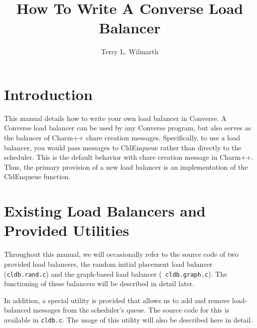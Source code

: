 \pagestyle{headings}
\setlength{\textwidth}{6.5in}
\setlength{\textheight}{9in}
\setlength{\parindent}{0in}
\setlength{\topmargin}{-.5in}
\parskip 0.1in


%
%
\newcommand{\version}{4.5}		%
\newcommand{\prevversion}{4.3}	%

%
%
\newcommand{\zap}[1]{ }
\newcommand{\fcmd}{\bf}		%
\newcommand{\fparm}{\it\sf}	%
\newcommand{\fexec}{\bf}	%
\newcommand{\atitle}[1]{{\it #1}}
\newcommand{\keyword}[1]{{\textbf{#1}}}
\newcommand{\userword}[1]{{\fparm \textsc{#1}}}
\newcommand{\constraint}[1]{Note: {\it #1}}
\newcommand{\note}[1]{Note: {\it #1}}

\title{How To Write A Converse Load Balancer}
\author{Terry L. Wilmarth}



\maketitle

\section{Introduction}

This manual details how to write your own load balancer in Converse.
A Converse load balancer can be used by any Converse program, but also
serves as the balancer of Charm++ chare creation messages.
Specifically, to use a load balancer, you would pass messages to
CldEnqueue rather than directly to the scheduler.  This is the default
behavior with chare creation message in Charm++.  Thus, the primary
provision of a new load balancer is an implementation of the
CldEnqueue function.

\section{Existing Load Balancers and Provided Utilities}

Throughout this manual, we will occasionally refer to the source code
of two provided load balancers, the random initial placement load balancer
({\tt cldb.rand.c}) and the graph-based load balancer ({\tt
cldb.graph.c}).  The functioning of these balancers will be described
in detail later.

In addition, a special utility is provided that allows us to add and
remove load-balanced messages from the scheduler's queue.  The source
code for this is available in {\tt cldb.c}.  The usage of this utility
will also be described here in detail.

